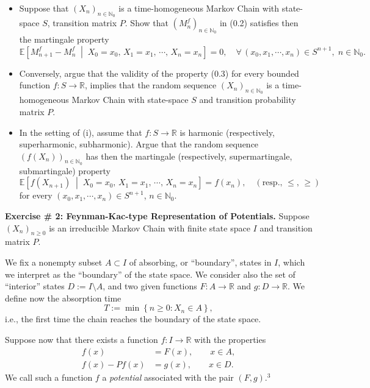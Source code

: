 \begin{itemize}
    \item[(i)] Suppose that $\left(X_n\right)_{n \in \mathbb{N}_0}$ is a time-homogeneous Markov Chain with state-space $S$, transition matrix $P$. Show that $\left(M^f_n\right)_{n \in \mathbb{N}_0}$ in (0.2) satisfies then the martingale property
    \begin{equation}
        \mathbb{E}\!\left[M^f_{n+1} - M^f_n \;\middle|\; X_0 = x_0,\, X_1 = x_1,\, \cdots,\, X_n = x_n\right] = 0, \quad \forall\, (x_0, x_1, \cdots, x_n) \in S^{n+1},\; n \in \mathbb{N}_0.
    \end{equation}

    \item[(ii)] Conversely, argue that the validity of the property (0.3) for every bounded function $f : S \to \mathbb{R}$, implies that the random sequence $\left(X_n\right)_{n \in \mathbb{N}_0}$ is a time-homogeneous Markov Chain with state-space $S$ and transition probability matrix $P$.

    \item[(iii)] In the setting of (i), assume that $f : S \to \mathbb{R}$ is harmonic (respectively, superharmonic, subharmonic). Argue that the random sequence $\left(f(X_n)\right)_{n \in \mathbb{N}_0}$ has then the martingale (respectively, supermartingale, submartingale) property
    \[
        \mathbb{E}\!\left[f(X_{n+1}) \;\middle|\; X_0 = x_0,\, X_1 = x_1,\, \cdots,\, X_n = x_n\right] = f(x_n), \quad (\text{resp., } \leq,\, \geq)
    \]
    for every $(x_0, x_1, \cdots, x_n) \in S^{n+1}$, $n \in \mathbb{N}_0$.
\end{itemize}

\textbf{Exercise \# 2: Feynman-Kac-type Representation of Potentials.} Suppose $(X_n)_{n \geq 0}$ is an irreducible Markov Chain with finite state space $I$ and transition matrix $P$.

We fix a nonempty subset $A \subset I$ of absorbing, or ``boundary'', states in $I$, which we interpret as the ``boundary'' of the state space. We consider also the set of ``interior'' states $D := I \setminus A$, and two given functions $F : A \to \mathbb{R}$ and $g : D \to \mathbb{R}$. We define now the absorption time
\[
    T := \min\left\{n \geq 0 : X_n \in A\right\},
\]
i.e., the first time the chain reaches the boundary of the state space.

Suppose now that there exists a function $f : I \to \mathbb{R}$ with the properties
\begin{align}
    f(x) &= F(x), \qquad x \in A, \\
    f(x) - Pf(x) &= g(x), \qquad x \in D.
\end{align}
We call such a function $f$ a \textit{potential} associated with the pair $(F, g)$.$^3$

